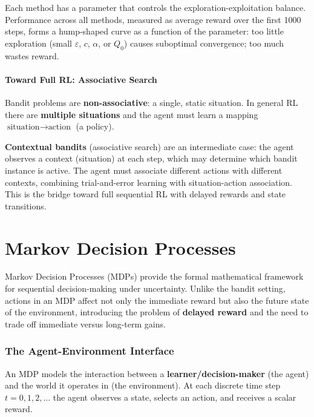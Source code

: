 \documentclass[11pt,a4paper]{article}
\theoremstyle{definition}
\theoremstyle{plain}
\theoremstyle{remark}
\begin{document}
Each method has a parameter that controls the exploration-exploitation balance. Performance across all methods, measured as average reward over the first 1000 steps, forms a hump-shaped curve as a function of the parameter: too little exploration (small $\varepsilon$, $c$, $\alpha$, or $Q_0$) causes suboptimal convergence; too much wastes reward.

\subsection{Toward Full RL: Associative Search}

Bandit problems are \textbf{non-associative}: a single, static situation. In general RL there are \textbf{multiple situations} and the agent must learn a mapping $\text{situation} \to \text{action}$ (a policy).

\textbf{Contextual bandits} (associative search) are an intermediate case: the agent observes a context (situation) at each step, which may determine which bandit instance is active. The agent must associate different actions with different contexts, combining trial-and-error learning with situation-action association. This is the bridge toward full sequential RL with delayed rewards and state transitions.



\part{Markov Decision Processes}

Markov Decision Processes (MDPs) provide the formal mathematical framework for sequential decision-making under uncertainty. Unlike the bandit setting, actions in an MDP affect not only the immediate reward but also the future state of the environment, introducing the problem of \textbf{delayed reward} and the need to trade off immediate versus long-term gains.

\section{The Agent-Environment Interface}

An MDP models the interaction between a \textbf{learner/decision-maker} (the agent) and the world it operates in (the environment). At each discrete time step $t = 0, 1, 2, \ldots$ the agent observes a state, selects an action, and receives a scalar reward.
\end{document}
